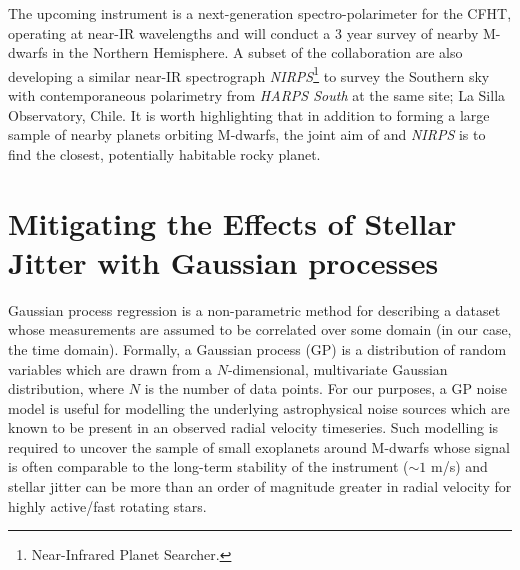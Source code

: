 \iffalse
The upcoming 
instrument is a next-generation spectro-polarimeter for the CFHT, operating at 
near-IR wavelengths and will conduct a 3 year survey of nearby M-dwarfs in the 
Northern Hemisphere. A subset of the \spirou{} collaboration are also 
developing a similar near-IR spectrograph 
\emph{NIRPS}\footnote{Near-Infrared Planet Searcher.} to survey the 
Southern sky with contemporaneous polarimetry from \emph{HARPS South} at the 
same site; La Silla Observatory, Chile. It is worth highlighting that 
in addition to forming a large sample of nearby planets orbiting 
M-dwarfs, the joint aim of \spirou{} and \emph{NIRPS} is to find the closest, 
potentially habitable rocky planet. 

\section{Mitigating the Effects of Stellar Jitter with Gaussian processes} 
\label{GP}
Gaussian process regression is a non-parametric method for describing a 
dataset whose measurements are assumed to be correlated over some domain 
(in our case, the time domain). Formally, a Gaussian process (GP) 
is a distribution of random variables which are drawn from 
a $N$-dimensional, multivariate Gaussian distribution, where $N$ is the number 
of data points. For our purposes, a GP noise model is useful for modelling the 
underlying astrophysical noise sources which are known to be present in an 
observed radial velocity timeseries. Such modelling is required to uncover the 
sample of small exoplanets around M-dwarfs whose signal is often comparable 
to the long-term stability of the instrument ($\sim 1$ m/s) and stellar 
jitter can be more than an order of magnitude greater in radial velocity 
for highly active/fast rotating stars.


